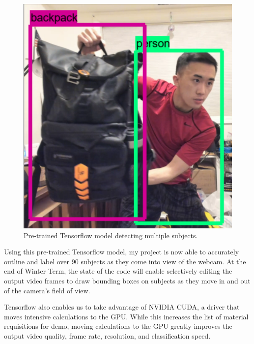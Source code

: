 \documentclass[onecolumn, draftclsnofoot,10pt, compsoc]{IEEEtran}
\makeatletter
\newcommand\captionof[1]{\def\@captype{#1}\caption}
\makeatother
\begin{document}
\begin{singlespace}
			\begin{figure}[H]
			\includegraphics[scale=0.4]{tensorflow.PNG}
			\captionof{figure}{Pre-trained Tensorflow model detecting multiple subjects.}
			\label{tf-detect}
			\end{figure}


			Using this pre-trained Tensorflow model, my project is now able to accurately outline and label over 90 subjects as they come into view of the webcam.
			At the end of Winter Term, the state of the code will enable selectively editing the output video frames to draw bounding boxes on subjects as they move in and out of the camera's field of view.


			Tensorflow also enables us to take advantage of NVIDIA CUDA, a driver that moves intensive calculations to the GPU.
			While this increases the list of material requisitions for demo, moving calculations to the GPU greatly improves the output video quality, frame rate, resolution, and classification speed. \cite{nvidia}


\end{singlespace}
\end{document}
